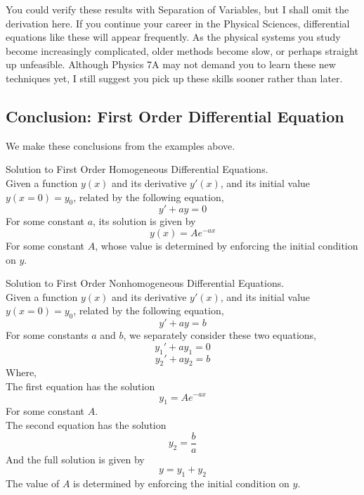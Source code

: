 \documentclass[11pt]{article}
\theoremstyle{gangnamstyle}{\newtheorem{definition}{Definition}[]}
\theoremstyle{gangnamstyle}{\newtheorem{example}{Example}[]}
\theoremstyle{gangnamstyle}{\newtheorem{problem}{Problem}[]}
\theoremstyle{gangnamstyle}{\newtheorem{warning}{Warning}[]}
\begin{document}
You could verify these results with Separation of Variables, but I shall omit the derivation here. If you continue your career in the Physical Sciences, differential equations like these will appear frequently. As the physical systems you study become increasingly complicated, older methods become slow, or perhaps straight up unfeasible. Although Physics 7A may not demand you to learn these new techniques yet, I still suggest you pick up these skills sooner rather than later. 

\subsection{Conclusion: First Order Differential Equation}

We make these conclusions from the examples above. 

\begin{definition}
Solution to First Order Homogeneous Differential Equations. \\
Given a function $y(x)$ and its derivative $y'(x)$, and its initial value $y(x = 0) = y_0$, related by the following equation, 
\begin{equation}
y' + ay = 0
\end{equation}
For some constant $a$, its solution is given by
\begin{equation}
y(x) = Ae^{-ax}
\end{equation}
For some constant $A$, whose value is determined by enforcing the initial condition on $y$. 
\end{definition}

\begin{definition}
Solution to First Order Nonhomogeneous Differential Equations. \\
Given a function $y(x)$ and its derivative $y'(x)$, and its initial value $y(x = 0) = y_0$, related by the following equation, 
\begin{equation}
y' + ay = b
\end{equation}
For some constants $a$ and $b$, we separately consider these two equations, 
\begin{equation}
y_1' + ay_1 = 0
\end{equation}
\begin{equation}
y_2' + ay_2 = b
\end{equation}
Where, \\
The first equation has the solution
\begin{equation}
y_1 = Ae^{-ax} 
\end{equation}
For some constant $A$. \\
The second equation has the solution
\begin{equation}
y_2 = \frac{b}{a}
\end{equation}
And the full solution is given by 
\begin{equation}
y = y_1 + y_2
\end{equation}
The value of $A$ is determined by enforcing the initial condition on $y$. 
\end{definition}
\pagebreak
\end{document}
